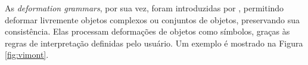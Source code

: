 \begin{figure}[h!]
	\centering
	\captionsetup{width=15cm}
	{}	
\end{figure}

As \textit{deformation grammars}, por sua vez, foram introduzidas por , permitindo deformar livremente objetos complexos ou conjuntos de objetos, preservando sua consistência. Elas processam deformações de objetos como símbolos, graças às regras de interpretação definidas pelo usuário. Um exemplo é mostrado na Figura \ref{fig:vimont}.

\begin{figure}[h!]
	\centering
	\captionsetup{width=15cm}
	{}	
\end{figure}